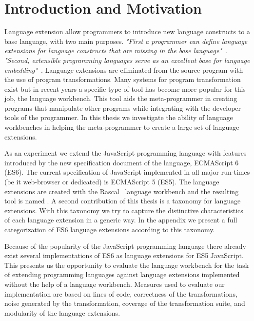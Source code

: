 
\chapter{Introduction and Motivation}

\label{Chapter1}


Language extension allow programmers to introduce new language constructs to a base language, with two main purposes. \textit{"First a programmer can define language extensions for language constructs that are missing in the base language"}~\cite{Erdweg2013}. \textit{"Second, extensible programming languages serve as an excellent base for language embedding"}~\cite{Erdweg2013}. Language extensions are eliminated from the source program with the use of program transformations. Many systems for program transformation exist but in recent years a specific type of tool has become more popular for this job, the language workbench. This tool aids the meta-programmer in creating programs that manipulate other programs while integrating with the developer tools of the programmer. In this thesis we investigate the ability of language workbenches in helping the meta-programmer to create a large set of language extensions. 

As an experiment we extend the JavaScript programming language with features introduced by the new specification document of the language, ECMAScript 6 (ES6). The current specification of JavaScript implemented in all major run-times (be it web-browser or dedicated) is ECMAScript 5 (ES5). The language extensions are created with the Rascal~\cite{Klinta} language workbench and the resulting tool is named \projectname. A second contribution of this thesis is a taxonomy for language extensions. With this taxonomy we try to capture the distinctive characteristics of each language extension in a generic way. In the appendix we present a full categorization of ES6 language extensions according to this taxonomy. 

Because of the popularity of the JavaScript programming language there already exist several implementations of ES6 as language extensions for ES5 JavaScript. This presents us the opportunity to evaluate the language workbench for the task of extending programming languages against language extensions implemented without the help of a language workbench.  
Measures used to evaluate our implementation are based on lines of code, correctness of the transformations, noise generated by the transformation, coverage of the transformation suite, and modularity of the language extensions.

